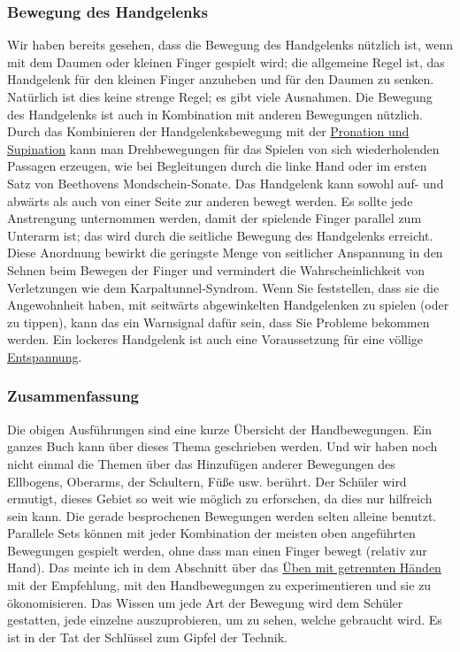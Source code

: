 \subsubsection{Bewegung des Handgelenks}

Wir haben bereits gesehen, dass die Bewegung des Handgelenks nützlich ist, wenn mit dem Daumen oder kleinen Finger gespielt wird; die allgemeine Regel ist, das Handgelenk für den kleinen Finger anzuheben und für den Daumen zu senken.
Natürlich ist dies keine strenge Regel; es gibt viele Ausnahmen.
Die Bewegung des Handgelenks ist auch in Kombination mit anderen Bewegungen nützlich.
Durch das Kombinieren der Handgelenksbewegung mit der \hyperref[c1iii4ProSup]{Pronation und Supination} kann man Drehbewegungen für das Spielen von sich wiederholenden Passagen erzeugen, wie bei Begleitungen durch die linke Hand oder im ersten Satz von Beethovens Mondschein-Sonate.
Das Handgelenk kann sowohl auf- und abwärts als auch von einer Seite zur anderen bewegt werden.
Es sollte jede Anstrengung unternommen werden, damit der spielende Finger parallel zum Unterarm ist; das wird durch die seitliche Bewegung des Handgelenks erreicht.
Diese Anordnung bewirkt die geringste Menge von seitlicher Anspannung in den Sehnen beim Bewegen der Finger und vermindert die Wahrscheinlichkeit von Verletzungen wie dem Karpaltunnel-Syndrom.
Wenn Sie feststellen, dass sie die Angewohnheit haben, mit seitwärts abgewinkelten Handgelenken zu spielen (oder zu tippen), kann das ein Warnsignal dafür sein, dass Sie Probleme bekommen werden.
Ein lockeres Handgelenk ist auch eine Voraussetzung für eine völlige \hyperref[c1ii14]{Entspannung}.


\subsubsection{Zusammenfassung}

Die obigen Ausführungen sind eine kurze Übersicht der Handbewegungen.
Ein ganzes Buch kann über dieses Thema geschrieben werden.
Und wir haben noch nicht einmal die Themen über das Hinzufügen anderer Bewegungen des Ellbogens, Oberarms, der Schultern, Füße usw. berührt.
Der Schüler wird ermutigt, dieses Gebiet so weit wie möglich zu erforschen, da dies nur hilfreich sein kann.
Die gerade besprochenen Bewegungen werden selten alleine benutzt.
Parallele Sets können mit jeder Kombination der meisten oben angeführten Bewegungen gespielt werden, ohne dass man einen Finger bewegt (relativ zur Hand).
Das meinte ich in dem Abschnitt über das \hyperref[c1ii7]{Üben mit getrennten Händen} mit der Empfehlung, mit den Handbewegungen zu experimentieren und sie zu ökonomisieren.
Das Wissen um jede Art der Bewegung wird dem Schüler gestatten, jede einzelne auszuprobieren, um zu sehen, welche gebraucht wird.
Es ist in der Tat der Schlüssel zum Gipfel der Technik.



